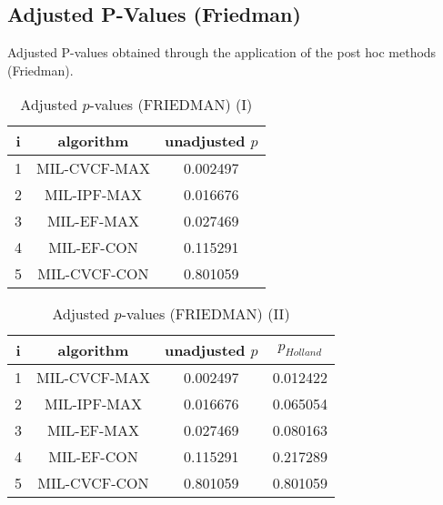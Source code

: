 \documentclass[a4paper,10pt]{article}
\begin{document}
\begin{landscape}
\newpage

\section{Adjusted P-Values (Friedman)}


Adjusted P-values obtained through the application of the post hoc methods (Friedman).

\begin{table}[!htp]
\centering\small
\begin{tabular}{ccc}
i&algorithm&unadjusted $p$\\
\hline1&MIL-CVCF-MAX&0.002497\\2&MIL-IPF-MAX&0.016676\\3&MIL-EF-MAX&0.027469\\4&MIL-EF-CON&0.115291\\5&MIL-CVCF-CON&0.801059\\\hline
\end{tabular}
\caption{Adjusted $p$-values (FRIEDMAN) (I)}
\end{table}
\begin{table}[!htp]
\centering\small
\begin{tabular}{cccc}
i&algorithm&unadjusted $p$&$p_{Holland}$\\
\hline1&MIL-CVCF-MAX&0.002497&0.012422\\2&MIL-IPF-MAX&0.016676&0.065054\\3&MIL-EF-MAX&0.027469&0.080163\\4&MIL-EF-CON&0.115291&0.217289\\5&MIL-CVCF-CON&0.801059&0.801059\\\hline
\end{tabular}
\caption{Adjusted $p$-values (FRIEDMAN) (II)}
\end{table}

\newpage
\end{landscape}
\end{document}

